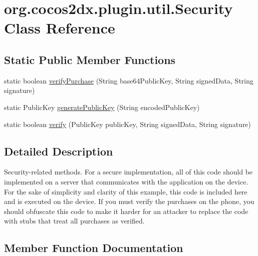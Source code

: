 \hypertarget{classorg_1_1cocos2dx_1_1plugin_1_1util_1_1Security}{}\section{org.\+cocos2dx.\+plugin.\+util.\+Security Class Reference}
\label{classorg_1_1cocos2dx_1_1plugin_1_1util_1_1Security}
\subsection*{Static Public Member Functions}
\begin{DoxyCompactItemize}
\item 
static boolean \hyperlink{classorg_1_1cocos2dx_1_1plugin_1_1util_1_1Security_a401bf8c98e41d91f507f73c9093767b3}{verify\+Purchase} (String base64\+Public\+Key, String signed\+Data, String signature)
\item 
static Public\+Key \hyperlink{classorg_1_1cocos2dx_1_1plugin_1_1util_1_1Security_a6cf0fcefbec7a89bf424ca279a707ad1}{generate\+Public\+Key} (String encoded\+Public\+Key)
\item 
static boolean \hyperlink{classorg_1_1cocos2dx_1_1plugin_1_1util_1_1Security_a3fa29a7c9d3376261f6dec700a19263f}{verify} (Public\+Key public\+Key, String signed\+Data, String signature)
\end{DoxyCompactItemize}


\subsection{Detailed Description}
Security-\/related methods. For a secure implementation, all of this code should be implemented on a server that communicates with the application on the device. For the sake of simplicity and clarity of this example, this code is included here and is executed on the device. If you must verify the purchases on the phone, you should obfuscate this code to make it harder for an attacker to replace the code with stubs that treat all purchases as verified. 

\subsection{Member Function Documentation}
\mbox{\label{classorg_1_1cocos2dx_1_1plugin_1_1util_1_1Security_a6cf0fcefbec7a89bf424ca279a707ad1}} 
